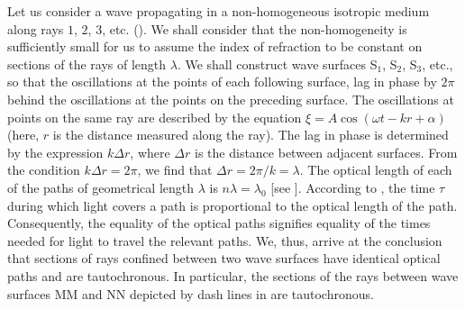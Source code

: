 Let us consider a wave propagating in a non-homogeneous isotropic medium along rays $1$, $2$, $3$, etc. ().
We shall consider that the non-homogeneity is sufficiently small for us to assume the index of refraction to be constant on sections of the rays of length $\lambda$.
We shall construct wave surfaces S$_1$, S$_2$, S$_3$, etc., so that the oscillations at the points of each following surface, lag in phase by $2\pi$ behind the oscillations at the points on the preceding surface.
The oscillations at points on the same ray are described by the equation $\xi=A\cos(\omega t - kr + \alpha)$ (here, $r$ is the distance measured along the ray).
The lag in phase is determined by the expression $k\Delta{r}$, where $\Delta{r}$ is the distance between adjacent surfaces.
From the condition $k\Delta{r}=2\pi$, we find that $\Delta{r}=2\pi/k=\lambda$.
The optical length of each of the paths of geometrical length $\lambda$ is $n\lambda=\lambda_0$ [see ].
According to , the time $\tau$ during which light covers a path is proportional to the optical length of the path.
Consequently, the equality of the optical paths signifies equality of the times needed for light to travel the relevant paths.
We, thus, arrive at the conclusion that sections of rays confined between two wave surfaces have identical optical paths and are tautochronous.
In particular, the sections of the rays between wave surfaces MM and NN depicted by dash lines in  are tautochronous.

